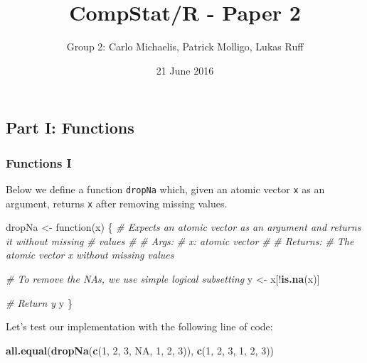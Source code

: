 \documentclass[11,]{article}
\title{CompStat/R - Paper 2}
\author{Group 2: Carlo Michaelis, Patrick Molligo, Lukas Ruff}
\date{21 June 2016}
\newenvironment{Shaded}{\begin{snugshade}}{\end{snugshade}}
\newcommand{\KeywordTok}[1]{\textcolor[rgb]{0.13,0.29,0.53}{\textbf{{#1}}}}
\newcommand{\DecValTok}[1]{\textcolor[rgb]{0.00,0.00,0.81}{{#1}}}
\newcommand{\StringTok}[1]{\textcolor[rgb]{0.31,0.60,0.02}{{#1}}}
\newcommand{\CommentTok}[1]{\textcolor[rgb]{0.56,0.35,0.01}{\textit{{#1}}}}
\newcommand{\OtherTok}[1]{\textcolor[rgb]{0.56,0.35,0.01}{{#1}}}
\newcommand{\NormalTok}[1]{{#1}}
\begin{document}
\maketitle


\subsection{Part I: Functions}\label{part-i-functions}

\subsubsection{Functions I}\label{functions-i}

Below we define a function \texttt{dropNa} which, given an atomic vector
\texttt{x} as an argument, returns \texttt{x} after removing missing
values.

\begin{Shaded}
\begin{Highlighting}[]
\NormalTok{dropNa <-}\StringTok{ }\NormalTok{function(x) \{}
  \CommentTok{# Expects an atomic vector as an argument and returns it without missing}
  \CommentTok{# values}
  \CommentTok{# }
  \CommentTok{# Args:}
  \CommentTok{#   x: atomic vector}
  \CommentTok{#}
  \CommentTok{# Returns:}
  \CommentTok{#   The atomic vector x without missing values}
  
  \CommentTok{# To remove the NAs, we use simple logical subsetting}
  \NormalTok{y <-}\StringTok{ }\NormalTok{x[!}\KeywordTok{is.na}\NormalTok{(x)]}
  
  \CommentTok{# Return y}
  \NormalTok{y}
\NormalTok{\}}
\end{Highlighting}
\end{Shaded}

Let's test our implementation with the following line of code:

\begin{Shaded}
\begin{Highlighting}[]
\KeywordTok{all.equal}\NormalTok{(}\KeywordTok{dropNa}\NormalTok{(}\KeywordTok{c}\NormalTok{(}\DecValTok{1}\NormalTok{, }\DecValTok{2}\NormalTok{, }\DecValTok{3}\NormalTok{, }\OtherTok{NA}\NormalTok{, }\DecValTok{1}\NormalTok{, }\DecValTok{2}\NormalTok{, }\DecValTok{3}\NormalTok{)), }\KeywordTok{c}\NormalTok{(}\DecValTok{1}\NormalTok{, }\DecValTok{2}\NormalTok{, }\DecValTok{3}\NormalTok{, }\DecValTok{1}\NormalTok{, }\DecValTok{2}\NormalTok{, }\DecValTok{3}\NormalTok{))}
\end{Highlighting}
\end{Shaded}
\end{document}
